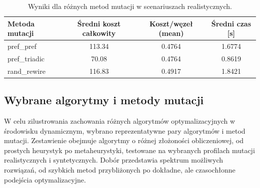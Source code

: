 \begin{table}[H]
  \centering
  \caption{Wyniki dla różnych metod mutacji w scenariuszach realistycznych.}
  \label{tab:dyn-real-warm}
  \begin{tabular}{lccc}
    \toprule
    \textbf{Metoda mutacji} & \textbf{Średni koszt całkowity} & \textbf{Koszt/węzeł (mean)} & \textbf{Średni czas [s]} \\
    \midrule
    pref\_pref              & 113.34                          & 0.4764                      & 1.6774                   \\
    pref\_triadic           & 70.08                           & 0.4764                      & 0.8619                   \\
    rand\_rewire            & 116.83                          & 0.4917                      & 1.8421                   \\
    \bottomrule
  \end{tabular}
\end{table}

\subsection{Wybrane algorytmy i metody mutacji}
W celu zilustrowania zachowania różnych algorytmów optymalizacyjnych w środowisku dynamicznym, wybrano reprezentatywne pary algorytmów i metod mutacji. Zestawienie obejmuje algorytmy o różnej złożoności obliczeniowej, od prostych heurystyk po metaheurystyki, testowane na wybranych profilach mutacji realistycznych i syntetycznych. Dobór przedstawia spektrum możliwych rozwiązań, od szybkich metod przybliżonych po dokładne, ale czasochłonne podejścia optymalizacyjne.

